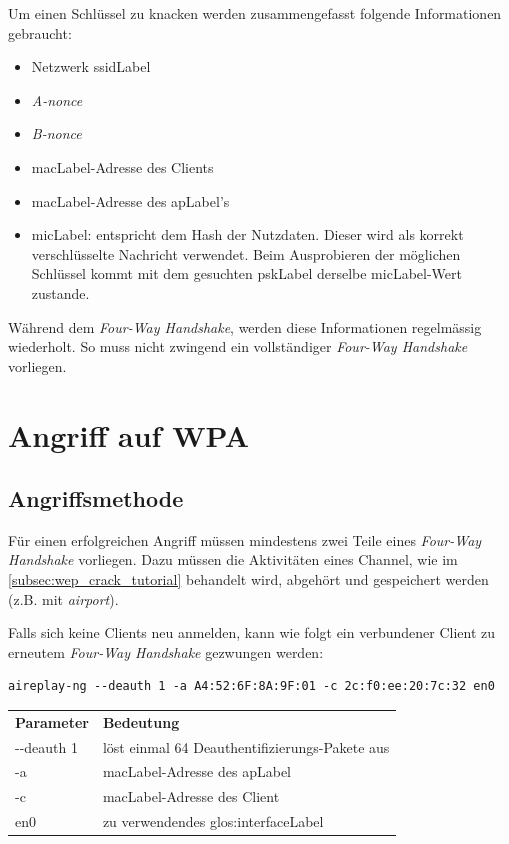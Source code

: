 
Um einen Schlüssel zu knacken werden zusammengefasst folgende Informationen gebraucht:
\begin{itemize}
	\item Netzwerk \gls{ssidLabel}
	\item \textit{A-nonce}
	\item \textit{B-nonce}
	\item \gls{macLabel}-Adresse des Clients
	\item \gls{macLabel}-Adresse des \gls{apLabel}'s
	\item \gls{micLabel}: entspricht dem Hash der Nutzdaten. Dieser wird als korrekt verschlüsselte Nachricht verwendet. Beim Ausprobieren der möglichen Schlüssel kommt mit dem gesuchten \gls{pskLabel} derselbe \gls{micLabel}-Wert zustande.
\end{itemize}

Während dem \textit{Four-Way Handshake}, werden diese Informationen regelmässig wiederholt.
So muss nicht zwingend ein vollständiger \textit{Four-Way Handshake} vorliegen.


\section{Angriff auf WPA}

\subsection{Angriffsmethode}
Für einen erfolgreichen Angriff müssen mindestens zwei Teile eines \textit{Four-Way Handshake} vorliegen.
Dazu müssen die Aktivitäten eines Channel, wie im \cref{subsec:wep_crack_tutorial} behandelt wird, abgehört und gespeichert werden (z.B. mit \textit{airport}).

Falls sich keine Clients neu anmelden, kann wie folgt ein verbundener Client zu erneutem \textit{Four-Way Handshake} gezwungen werden:
\begin{lstlisting}[style=lstStyleFramed]
aireplay-ng --deauth 1 -a A4:52:6F:8A:9F:01 -c 2c:f0:ee:20:7c:32 en0
\end{lstlisting}
\begin{tabular}{l l}
	\textbf{Parameter} & \textbf{Bedeutung}\\
	-{}-deauth 1 & löst einmal 64 Deauthentifizierungs-Pakete aus\\
	-a	& \gls{macLabel}-Adresse des \gls{apLabel}\\
	-c	& \gls{macLabel}-Adresse des Client\\
	en0 & zu verwendendes \gls{glos:interfaceLabel}
\end{tabular}

